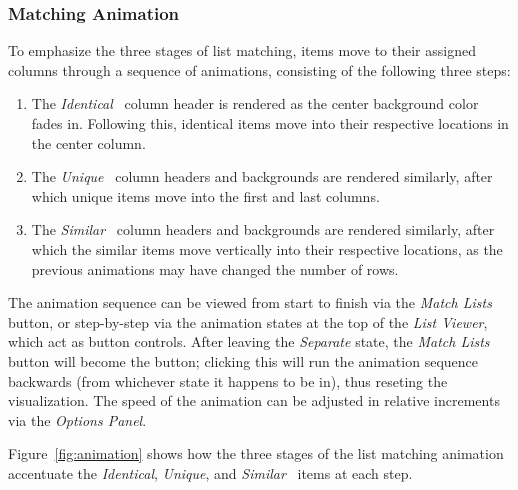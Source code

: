 \documentclass{chi2009}
\newcommand{\ListViewer}{\textit{List Viewer}}
\newcommand{\Options}{\textit{Options Panel}}
\newcommand{\Similar}{\textit{Similar}}
\newcommand{\Identical}{\textit{Identical}}
\newcommand{\Unique}{\textit{Unique}}
\begin{document}
\subsubsection{Matching Animation}
To emphasize the three stages of list matching, items move to their assigned columns through a sequence of animations, consisting of the following three steps:
\begin{enumerate}
\item The \Identical~ column header is rendered as the center background color fades in. Following this, identical items move into their respective locations in the center column.
\item The \Unique~ column headers and backgrounds are rendered similarly, after which unique items move into the first and last columns.
\item The \Similar~ column headers and backgrounds are rendered similarly, after which the similar items move vertically into their respective locations, as the previous animations may have changed the number of rows.
\end{enumerate}

The animation sequence can be viewed from start to finish via the \textit{Match Lists} button, or step-by-step via the animation states at the top of the \ListViewer, which act as button controls. After leaving the \textit{Separate} state, the \textit{Match Lists} button will become the  button; clicking this will run the animation sequence backwards (from whichever state it happens to be in), thus reseting the visualization. The speed of the animation can be adjusted in relative increments via the \Options.

Figure~\ref{fig:animation} shows how the three stages of the list matching animation accentuate the \Identical, \Unique, and \Similar~ items at each step.
\end{document}
